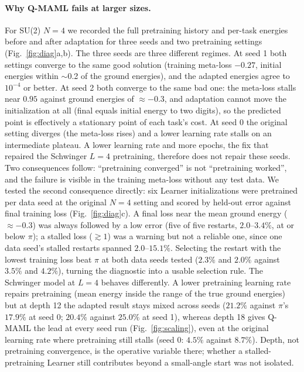 \documentclass[pdflatex,sn-mathphys-num]{sn-jnl}
\begin{document}
\paragraph{Why Q-MAML fails at larger sizes.} For SU(2) $N{=}4$ we recorded the full pretraining history and per-task energies before and after adaptation for three seeds and two pretraining settings (Fig.~\ref{fig:diag}a,b). The three seeds are three different regimes. At seed 1 both settings converge to the same good solution (training meta-loss $-0.27$, initial energies within $\sim$0.2 of the ground energies), and the adapted energies agree to $10^{-4}$ or better. At seed 2 both converge to the same bad one: the meta-loss stalls near $0.95$ against ground energies of $\approx-0.3$, and adaptation cannot move the initialization at all (final equals initial energy to two digits), so the predicted point is effectively a stationary point of each task's cost. At seed 0 the original setting diverges (the meta-loss rises) and a lower learning rate stalls on an intermediate plateau. A lower learning rate and more epochs, the fix that repaired the Schwinger $L{=}4$ pretraining, therefore does not repair these seeds. Two consequences follow: ``pretraining converged'' is not ``pretraining worked'', and the failure is visible in the training meta-loss without any test data. We tested the second consequence directly: six Learner initializations were pretrained per data seed at the original $N{=}4$ setting and scored by held-out error against final training loss (Fig.~\ref{fig:diag}c). A final loss near the mean ground energy ($\approx-0.3$) was always followed by a low error (five of five restarts, $2.0$--$3.4\%$, at or below $\pi$); a stalled loss ($\gtrsim1$) was a warning but not a reliable one, since one data seed's stalled restarts spanned $2.0$--$15.1\%$. Selecting the restart with the lowest training loss beat $\pi$ at both data seeds tested ($2.3\%$ and $2.0\%$ against $3.5\%$ and $4.2\%$), turning the diagnostic into a usable selection rule. The Schwinger model at $L{=}4$ behaves differently. A lower pretraining learning rate repairs pretraining (mean energy inside the range of the true ground energies) but at depth 12 the adapted result stays mixed across seeds ($21.2\%$ against $\pi$'s $17.9\%$ at seed 0; $20.4\%$ against $25.0\%$ at seed 1), whereas depth 18 gives Q-MAML the lead at every seed run (Fig.~\ref{fig:scaling}), even at the original learning rate where pretraining still stalls (seed 0: $4.5\%$ against $8.7\%$). Depth, not pretraining convergence, is the operative variable there; whether a stalled-pretraining Learner still contributes beyond a small-angle start was not isolated.
\end{document}
